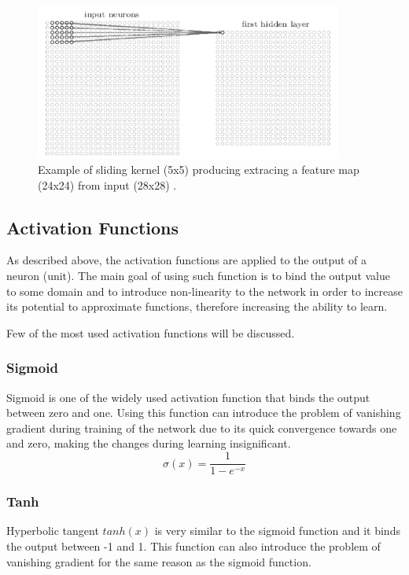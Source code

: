 \documentclass[thesis=M,english]{FITthesis}[2019/03/06]
\begin{document}
\begin{figure}[ht]
	\centering
	\includegraphics[width=0.9\textwidth, height=0.4\textwidth]{imgs/conv-example.png}
	\caption{Example of sliding kernel (5x5) producing extracing a feature map (24x24) from input (28x28) \cite{nielsenneural}.}
	\label{label:kernel_sliding}
\end{figure}



\subsection{Activation Functions}
As described above, the activation functions are applied to the output of a neuron (unit). The main goal of using such function is to bind the output value to some domain and to introduce non-linearity to the network in order to increase its potential to approximate functions, therefore increasing the ability to learn.

Few of the most used activation functions will be discussed.


\subsubsection{Sigmoid}
Sigmoid is one of the widely used activation function that binds the output between zero and one. Using this function can introduce the problem of vanishing gradient during training of the network due to its quick convergence towards one and zero, making the changes during learning insignificant.
$$
\sigma(x) = \frac{1}{1-e^{-x}}
$$
\subsubsection{Tanh}
Hyperbolic tangent $tanh(x)$ is very similar to the sigmoid function and it binds the output between -1 and 1. This function can also introduce the problem of vanishing gradient for the same reason as the sigmoid function. 
\end{document}
